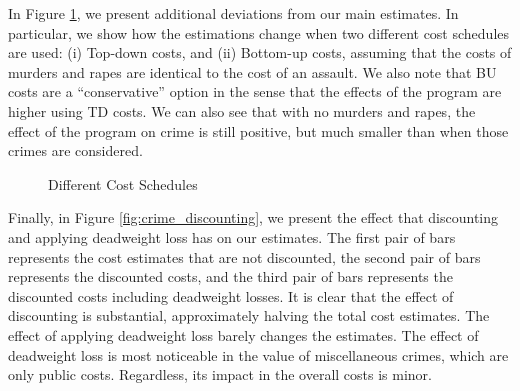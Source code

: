 \noindent In Figure \ref{fig:costs_schedules}, we present additional deviations from our main estimates. In particular, we show how the estimations change when two different cost schedules are used: (i) Top-down costs, and (ii) Bottom-up costs, assuming that the costs of murders and rapes are identical to the cost of an assault. We also note that BU costs are a ``conservative'' option in the sense that the effects of the program are higher using TD costs. We can also see that with no murders and rapes, the effect of the program on crime is still positive, but much smaller than when those crimes are considered. \\

\begin{figure} [H]
\caption{Different Cost Schedules}
\centering  \label{fig:costs_schedules}
{}
\end{figure}

\noindent Finally, in Figure \ref{fig:crime_discounting}, we present the effect that discounting and applying deadweight loss has on our estimates. The first pair of bars represents the cost estimates that are not discounted, the second pair of bars represents the discounted costs, and the third pair of bars represents the discounted costs including deadweight losses. It is clear that the effect of discounting is substantial, approximately halving the total cost estimates. The effect of applying deadweight loss barely changes the estimates. The effect of deadweight loss is most noticeable in the value of miscellaneous crimes, which are only public costs. Regardless, its impact in the overall costs is minor. \\


